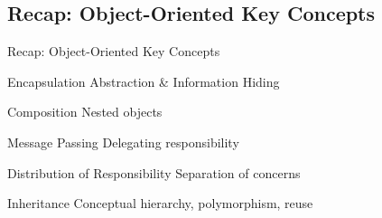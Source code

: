 
\subsection{Recap: Object-Oriented Key Concepts}

\begin{frame}{Recap: Object-Oriented Key Concepts}
	\begin{mycolumns}[forget]
		\begin{definition}{Encapsulation}
			Abstraction \& Information Hiding
		\end{definition}	
		\begin{definition}{Composition}
			Nested objects
		\end{definition}
		\begin{definition}{Message Passing}
			Delegating responsibility
		\end{definition}
		\begin{definition}{Distribution of Responsibility}
			Separation of concerns
		\end{definition}
		\begin{definition}{Inheritance}
			Conceptual hierarchy, polymorphism, reuse
		\end{definition}
	\mynextcolumn
	\end{mycolumns}
\end{frame}

